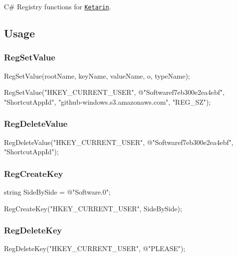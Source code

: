 \href{https://github.com/coldscientist/regclasscs/blob/master/LICENSE}{\tt }

C\# Registry functions for \href{http://ketarin.canneverbe.com}{\tt Ketarin}.

\subsection*{Usage}

\subsubsection*{Reg\+Set\+Value}

\begin{DoxyVerb}RegSetValue(rootName, keyName, valueName, o, typeName);

RegSetValue("HKEY_CURRENT_USER", @"Software\Microsoft\Windows\CurrentVersion\Uninstall\5f7eb300e2ea4ebf", "ShortcutAppId", "github-windows.s3.amazonaws.com", "REG_SZ");
\end{DoxyVerb}


\subsubsection*{Reg\+Delete\+Value}

\begin{DoxyVerb}RegDeleteValue("HKEY_CURRENT_USER", @"Software\Microsoft\Windows\CurrentVersion\Uninstall\5f7eb300e2ea4ebf", "ShortcutAppId");
\end{DoxyVerb}


\subsubsection*{Reg\+Create\+Key}

\begin{DoxyVerb}string SideBySide = @"Software\Classes\Software\Microsoft\Windows\CurrentVersion\Deployment\SideBySide\2.0";

RegCreateKey("HKEY_CURRENT_USER", SideBySide);
\end{DoxyVerb}


\subsubsection*{Reg\+Delete\+Key}

\begin{DoxyVerb}RegDeleteKey("HKEY_CURRENT_USER", @"PLEASE\BE\CAREFUL");
\end{DoxyVerb}


